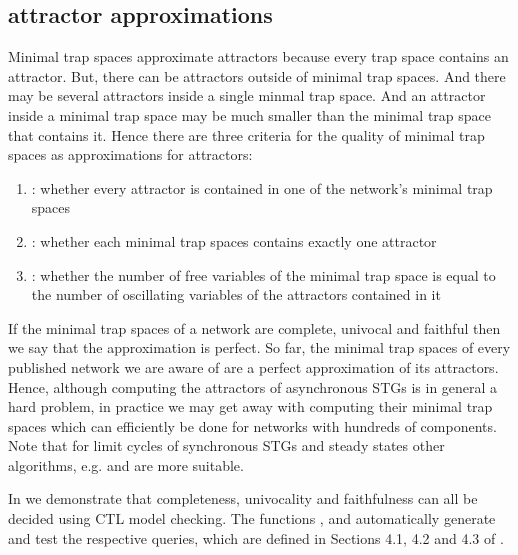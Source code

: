 \documentclass[letterpaper,10pt,english]{sphinxmanual}
\begin{document}
\subsection{attractor approximations}
\label{\detokenize{Manual:attractor-approximations}}
Minimal trap spaces approximate attractors because every trap space contains an attractor.
But, there can be attractors outside of minimal trap spaces.
And there may be several attractors inside a single minmal trap space.
And an attractor inside a minimal trap space may be much smaller than the minimal trap space that contains it.
Hence there are three criteria for the quality of minimal trap spaces as approximations for attractors:
\begin{enumerate}
\item {} 
: whether every attractor is contained in one of the network’s minimal trap spaces

\item {} 
: whether each minimal trap spaces contains exactly one attractor

\item {} 
: whether the number of free variables of the minimal trap space is equal to the number of oscillating variables of the attractors contained in it

\end{enumerate}

If the minimal trap spaces of a network are complete, univocal and faithful then we say that the approximation is perfect.
So far, the minimal trap spaces of every published network we are aware of are a perfect approximation of its attractors.
Hence, although computing the attractors of asynchronous STGs is in general a hard problem,
in practice we may get away with computing their minimal trap spaces which can efficiently be done for networks with hundreds of components.
Note that for limit cycles of synchronous STGs and steady states other algorithms, e.g. {\hyperref[\detokenize{Bibliography:dubrova2011}]{}} and {\hyperref[\detokenize{Bibliography:naldi2007}]{}} are more suitable.

In {\hyperref[\detokenize{Bibliography:klarner2015trap}]{}} we demonstrate that completeness, univocality and faithfulness can all be decided using CTL model checking.
The functions {\hyperref[\detokenize{Attractors:completeness}]{}}, {\hyperref[\detokenize{Attractors:univocality}]{}} and {\hyperref[\detokenize{Attractors:faithfulness}]{}} automatically generate and test the respective queries,
which are defined in Sections 4.1, 4.2 and 4.3 of {\hyperref[\detokenize{Bibliography:klarner2015trap}]{}}.
\end{document}

